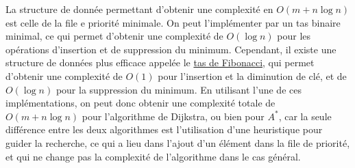 La structure de donnée permettant d'obtenir une complexité en $O(m + n\log n)$ est celle de la file e priorité minimale. On peut l'implémenter par un tas binaire minimal, ce qui permet d'obtenir une complexité de $O(\log n)$ pour les opérations d'insertion et de suppression du minimum. Cependant, il existe une structure de données plus efficace appelée le \href{https://www.google.com/url?sa=t&source=web&rct=j&opi=89978449&url=https://lirias.kuleuven.be/retrieve/353036&ved=2ahUKEwjO2rrPwpKTAxW7dqQEHWRbFtkQFnoECDcQAQ&usg=AOvVaw3Ylzd0cMfgLtrKYd2Y9Ppi}{tas de Fibonacci}, qui permet d'obtenir une complexité de $O(1)$ pour l'insertion et la diminution de clé, et de $O(\log n)$ pour la suppression du minimum. En utilisant l'une de ces implémentations, on peut donc obtenir une complexité totale de $O(m + n\log n)$ pour l'algorithme de Dijkstra, ou bien pour $A^*$, car la seule différence entre les deux algorithmes est l'utilisation d'une heuristique pour guider la recherche, ce qui a lieu dans l'ajout d'un élément dans la file de priorité, et qui ne change pas la complexité de l'algorithme dans le cas général.


